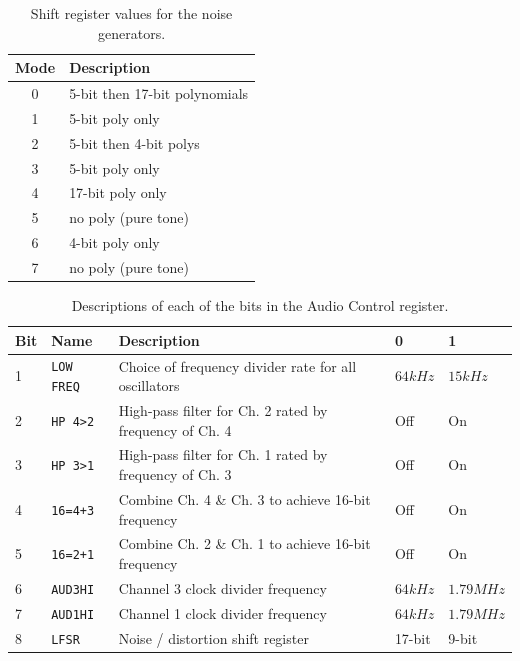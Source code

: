 \documentclass[12pt,letter]{article}
\begin{document}
\begin{table}[!htp]
\centering
\caption{Shift register values for the noise generators.}
\label{tab:shift-register}
\small
\begin{tabular}{|c||l|}
\hline
Mode & Description                   \\
\hline\hline
 0    & 5-bit then 17-bit polynomials \\
 1    & 5-bit poly only               \\
 2    & 5-bit then 4-bit polys        \\
 3    & 5-bit poly only               \\
 4    & 17-bit poly only              \\
 5    & no poly (pure tone)           \\
 6    & 4-bit poly only               \\
 7    & no poly (pure tone)           \\
\hline
\end{tabular}
\end{table}

\begin{table}[!htp]
\centering
\caption{Descriptions of each of the bits in the Audio Control register.}
\label{tab:audio-control}
\small
\begin{tabular}{|l|l||l|l|l|}
\hline
 Bit & Name              & Description                                            & 0        & 1          \\
\hline\hline
 1   & \texttt{LOW FREQ} & Choice of frequency divider rate for all oscillators      & $64 kHz$ & $15 kHz$   \\
 2   & \texttt{HP 4>2}   & High-pass filter for Ch. 2 rated by frequency of Ch. 4 & Off      & On         \\
 3   & \texttt{HP 3>1}   & High-pass filter for Ch. 1 rated by frequency of Ch. 3 & Off      & On         \\
 4   & \texttt{16=4+3}   & Combine Ch. 4 \& Ch. 3 to achieve 16-bit frequency     & Off      & On         \\
 5   & \texttt{16=2+1}   & Combine Ch. 2 \& Ch. 1 to achieve 16-bit frequency     & Off      & On         \\
 6   & \texttt{AUD3HI}   & Channel 3 clock divider frequency                      & $64 kHz$ & $1.79 MHz$ \\
 7   & \texttt{AUD1HI}   & Channel 1 clock divider frequency                      & $64 kHz$ & $1.79 MHz$ \\
 8   & \texttt{LFSR}     & Noise / distortion shift register                      & 17-bit   & 9-bit      \\
\hline
\end{tabular}
\end{table}


\clearpage
\renewcommand\refname{References \& Acknowledgments}
\nocite{*}


\end{document}

